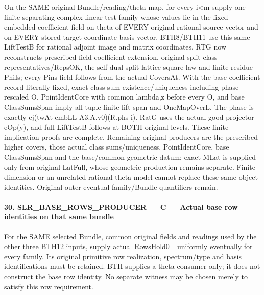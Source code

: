 On the SAME original Bundle/reading/theta map, for every i<m supply one finite separating complex-linear test family whose values lie in the fixed embedded coefficient field on theta of EVERY original rational source vector and on EVERY stored target-coordinate basis vector. BTH8/BTH11 use this same LiftTestB for rational adjoint image and matrix coordinates. RTG now reconstructs prescribed-field coefficient extension, original split class representatives/RepsOK, the self-dual split-lattice square law and finite residue PhiIs; every Pins field follows from the actual CoversAt. With the base coefficient record literally fixed, exact class-sum existence/uniqueness including phase-rescaled O, PointIdentCore with common lambda,z before every O, and base ClassSumsSpan imply all-tuple finite lift span and OneMapOverL. The phase is exactly cj(twAt embLL A3.A.v0)(R.phs i). RatG uses the actual good projector eOp(y), and full LiftTestB follows at BOTH original levels. These finite implication proofs are complete. Remaining original producers are the prescribed higher covers, those actual class sums/uniqueness, PointIdentCore, base ClassSumsSpan and the base/common geometric datum; exact MLat is supplied only from original LatFull, whose geometric production remains separate. Finite dimension or an unrelated rational theta model cannot replace these same-object identities. Original outer eventual-family/Bundle quantifiers remain.



\paragraph{30. SLR\_\allowbreak BASE\_\allowbreak ROWS\_\allowbreak PRODUCER — C — Actual base row identities on that same bundle}

For the SAME selected Bundle, common original fields and readings used by the other three BTH12 inputs, supply actual RowsHold0\_ uniformly eventually for every family. Its original primitive row realization, spectrum/type and basis identifications must be retained. BTH supplies a theta consumer only; it does not construct the base row identity. No separate witness may be chosen merely to satisfy this row requirement.


